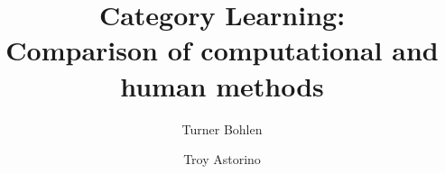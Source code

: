 \documentclass[12pt]{article}
\title{Category Learning: \\Comparison of computational and human methods}
\author{Turner Bohlen \and Troy Astorino}
\begin{document}
\maketitle
\newpage








\newpage
\nocite{*}



\newpage

\end{document}
